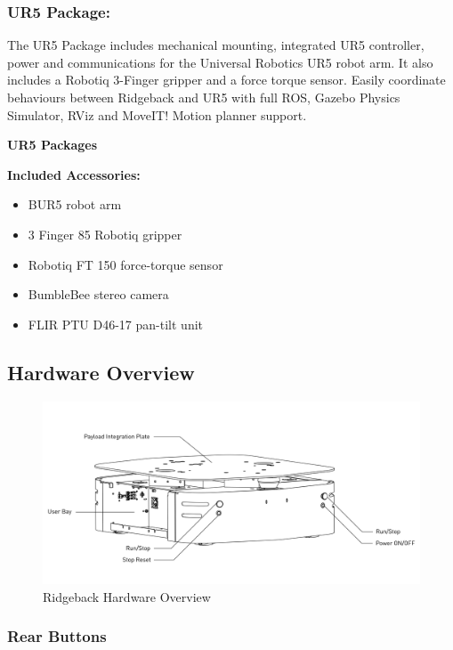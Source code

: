 \documentclass[]{clearpath-latex/clearpath-manual}
\begin{document}
\subsubsection{UR5 Package:}

The UR5 Package includes mechanical mounting, integrated UR5 controller, power and communications for the Universal Robotics UR5 robot arm. It also includes a Robotiq 3-Finger gripper and a force torque sensor. Easily coordinate behaviours between Ridgeback and UR5 with full ROS, Gazebo Physics Simulator, RViz and MoveIT! Motion planner support.

\textbf{UR5 Packages}

\textbf{Included Accessories:}

\begin{itemize}[nolistsep]
	\item BUR5 robot arm
	\item 3 Finger 85 Robotiq gripper
	\item Robotiq FT 150 force-torque sensor
	\item BumbleBee stereo camera
	\item FLIR PTU D46-17 pan-tilt unit
\end{itemize}



\subsection{Hardware Overview}

\begin{figure}[h]
  \centering
  \includegraphics[width=1\linewidth]{Ridgeback_Rear_Drawing_Labeled.pdf}
  \caption{Ridgeback Hardware Overview}
  \label{ridgeback_overview}
\end{figure}

\subsubsection{Rear Buttons}
\end{document}
